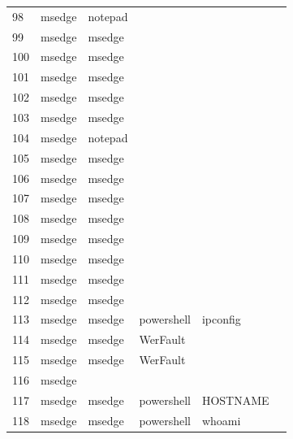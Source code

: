 \documentclass[a4paper,twoside,12pt]{book}
\begin{document}
\begin{appendices}
\begin{table}
\begin{tabular}{l|l|l|l|l|l}
		98  &  msedge &        notepad &                &                &                \\
		99  &  msedge &         msedge &                &                &                \\
		100 &  msedge &         msedge &                &                &                \\
		101 &  msedge &         msedge &                &                &                \\
		102 &  msedge &         msedge &                &                &                \\
		103 &  msedge &         msedge &                &                &                \\
		104 &  msedge &        notepad &                &                &                \\
		105 &  msedge &         msedge &                &                &                \\
		106 &  msedge &         msedge &                &                &                \\
		107 &  msedge &         msedge &                &                &                \\
		108 &  msedge &         msedge &                &                &                \\
		109 &  msedge &         msedge &                &                &                \\
		110 &  msedge &         msedge &                &                &                \\
		111 &  msedge &         msedge &                &                &                \\
		112 &  msedge &         msedge &                &                &                \\
		113 &  msedge &         msedge &     powershell &       ipconfig &                \\
		114 &  msedge &         msedge &       WerFault &                &                \\
		115 &  msedge &         msedge &       WerFault &                &                \\
		116 &  msedge &                &                &                &                \\
		117 &  msedge &         msedge &     powershell &       HOSTNAME &                \\
		118 &  msedge &         msedge &     powershell &         whoami &                \\

\end{tabular}
\end{table}
\end{appendices}
\end{document}
